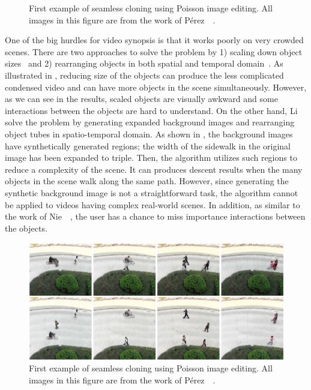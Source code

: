 \documentclass[11pt]{hyu_thesis}
\begin{document}
\begin{figure}
{	}
	\caption{First example of seamless cloning using Poisson image editing. All images in this figure are from the work of P{\'e}rez~\etal~\cite{Perez2003}.}
	\label{fig:Li}
\end{figure}

One of the big hurdles for video synopsis is that it works poorly on very crowded scenes. There are two approaches to solve the problem by 1) scaling down object sizes~\cite{Li2016} and 2) rearranging objects in both spatial and temporal domain~\cite{Nie2014}. As illustrated in , reducing size of the objects can produce the less complicated condensed video and can have more objects in the scene simultaneously. However, as we can see in the results, scaled objects are visually awkward and some interactions between the objects are hard to understand. On the other hand, Li~\etal~\cite{Li2016} solve the problem by generating expanded background images and rearranging object tubes in spatio-temporal domain. As shown in , the background images have synthetically generated regions; the width of the sidewalk in the original image has been expanded to triple. Then, the algorithm utilizes such regions to reduce a complexity of the scene. It can produces descent results when the many objects in the scene walk along the same path. However, since generating the synthetic background image is not a straightforward task, the algorithm cannot be applied to videos having complex real-world scenes. In addition, as similar to the work of Nie~\etal~\cite{Nie2014}, the user has a chance to miss importance interactions between the objects.

\begin{figure}
	\centering
	\includegraphics[width=0.9\linewidth]{ext-nie.png}
	\caption{First example of seamless cloning using Poisson image editing. All images in this figure are from the work of P{\'e}rez~\etal~\cite{Perez2003}.}
	\label{fig:Nie}
\end{figure}
\end{document}
